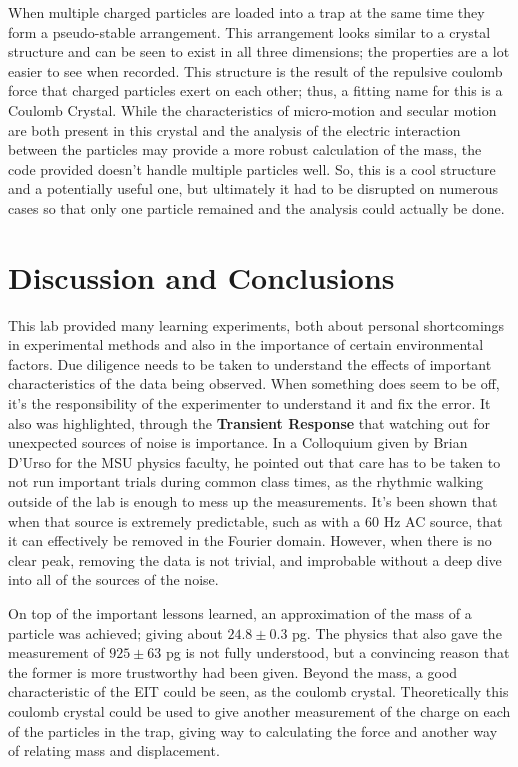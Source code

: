 \documentclass[12pt]{article}
\begin{document}
When multiple charged particles are loaded into a trap at the same time they form a pseudo-stable arrangement. This arrangement looks similar to a crystal structure and can be seen to exist in all three dimensions; the properties are a lot easier to see when recorded. This structure is the result of the repulsive coulomb force that charged particles exert on each other; thus, a fitting name for this is a Coulomb Crystal. While the characteristics of micro-motion and secular motion are both present in this crystal and the analysis of the electric interaction between the particles may provide a more robust calculation of the mass, the code provided doesn't handle multiple particles well. So, this is a cool structure and a potentially useful one, but ultimately it had to be disrupted on numerous cases so that only one particle remained and the analysis could actually be done. 



\section{Discussion and Conclusions}

This lab provided many learning experiments, both about personal shortcomings in experimental methods and also in the importance of certain environmental factors. Due diligence needs to be taken to understand the effects of important characteristics of the data being observed. When something does seem to be off, it's the responsibility of the experimenter to understand it and fix the error. It also was highlighted, through the \textbf{Transient Response} that watching out for unexpected sources of noise is importance. In a Colloquium given by Brian D'Urso for the MSU physics faculty, he pointed out that care has to be taken to not run important trials during common class times, as the rhythmic walking outside of the lab is enough to mess up the measurements. It's been shown that when that source is extremely predictable, such as with a 60 Hz AC source, that it can effectively be removed in the Fourier domain. However, when there is no clear peak, removing the data is not trivial, and improbable without a deep dive into all of the sources of the noise. 

On top of the important lessons learned, an approximation of the mass of a particle was achieved; giving about $24.8 \pm 0.3$ pg. The physics that also gave the measurement of $925 \pm 63$ pg is not fully understood, but a convincing reason that the former is more trustworthy had been given. Beyond the mass, a good characteristic of the EIT could be seen, as the coulomb crystal. Theoretically this coulomb crystal could be used to give another measurement of the charge on each of the particles in the trap, giving way to calculating the force and another way of relating mass and displacement.
\end{document}
